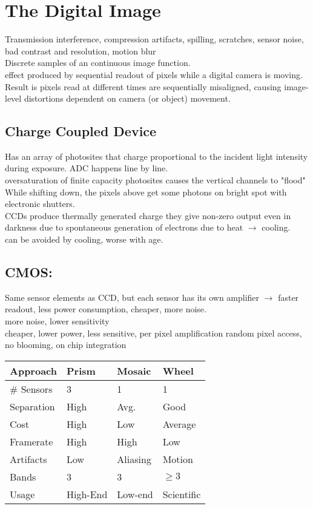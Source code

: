 

\section{The Digital Image}
 Transmission interference, compression artifacts, spilling, scratches, sensor noise, bad contrast and resolution, motion blur \\
 Discrete samples of an continuous image function.\\
 effect produced by sequential readout of pixels while a digital camera is moving. Result is pixels read at different times are sequentially misaligned, causing image-level distortions dependent on camera (or object) movement.
\subsection*{Charge Coupled Device }
Has an array of photosites  that charge proportional to the incident light intensity during exposure. ADC happens line by line. \\
 oversaturation of finite capacity photosites causes the vertical channels to "flood" \\
 While shifting down, the pixels above get some photons on bright spot with electronic shutters.\\
 CCDs produce thermally generated charge they give non-zero output even in darkness  due to spontaneous generation of electrons due to heat $\rightarrow$ cooling.\\ can be avoided by cooling, worse with age.
\subsection*{CMOS:}
Same sensor elements as CCD, but each sensor has its own amplifier $\rightarrow$ faster readout, less power consumption, cheaper, more noise.\\ more noise, lower sensitivity\\
 cheaper, lower power, less sensitive, per pixel amplification random pixel access, no blooming, on chip integration

\begin{tabularx}{\linewidth}{|X|X|X|X|}
    \hline
    Approach & Prism & Mosaic & Wheel \\ \hline
    \# Sensors & 3 & 1 & 1 \\ \hline
    Separation & High & Avg. & Good \\ \hline
    Cost & High & Low & Average \\ \hline
    Framerate & High & High & Low \\ \hline
    Artifacts & Low & Aliasing & Motion \\ \hline
    Bands & 3 & 3 & \(\geq 3\) \\ \hline
    Usage & High-End & Low-end & Scientific \\ \hline
  \end{tabularx}

